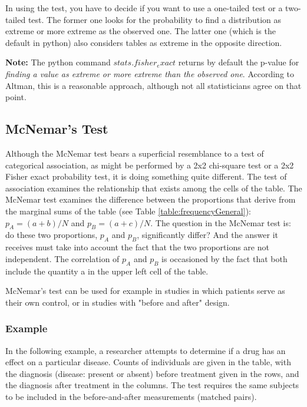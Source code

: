 In using the test, you have to decide if you want to use a one-tailed test or a two-tailed test. The former one looks for the probability to find a distribution as extreme or more extreme as the observed one. The latter one (which is the default in python) also considers tables as extreme in the opposite direction.

\textbf{Note:} The python command $stats.fisher_exact$ returns by default the p-value for \emph{finding a value as extreme or more extreme than the observed one}. According to Altman, this is a reasonable approach, although not all statisticians agree on that point.

\subsection{McNemar's Test}

Although the McNemar test bears a superficial resemblance to a test of categorical association, as might be performed by a 2x2 chi-square test or a 2x2 Fisher exact probability test, it is doing something quite different. The test of association examines the relationship that exists among the cells of the table. The McNemar test examines the difference between the proportions that derive from the marginal sums of the table (see Table \ref{table:frequencyGeneral}): $p_A=(a+b)/N$ and $p_B=(a+c)/N$. The question in the McNemar test is: do these two proportions, $p_A$ and $p_B$, significantly differ? And the answer it receives must take into account the fact that the two proportions are not independent. The correlation of $p_A$ and $p_B$ is occasioned by the fact that both include the quantity a in the upper left cell of the table.

McNemar's test can be used for example in studies in which patients serve as their own control, or in studies with "before and after" design.

\subsubsection{Example}

In the following example, a researcher attempts to determine if a drug has an effect on a particular disease. Counts of individuals are given in the table, with the diagnosis (disease: present or absent) before treatment given in the rows, and the diagnosis after treatment in the columns. The test requires the same subjects to be included in the before-and-after measurements (matched pairs).

